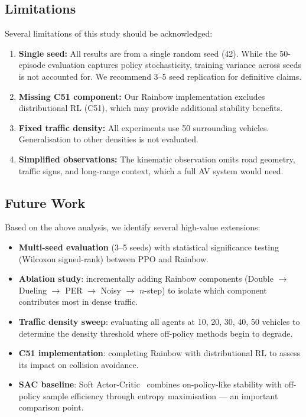 \documentclass[conference]{IEEEtran}
\begin{document}
\subsection{Limitations}

Several limitations of this study should be acknowledged:
\begin{enumerate}
  \item \textbf{Single seed:} All results are from a single random seed (42). While
        the 50-episode evaluation captures policy stochasticity, training variance
        across seeds is not accounted for. We recommend 3--5 seed replication for
        definitive claims.
  \item \textbf{Missing C51 component:} Our Rainbow implementation excludes
        distributional RL (C51), which may provide additional stability benefits.
  \item \textbf{Fixed traffic density:} All experiments use 50 surrounding vehicles.
        Generalisation to other densities is not evaluated.
  \item \textbf{Simplified observations:} The kinematic observation omits road
        geometry, traffic signs, and long-range context, which a full AV system
        would need.
\end{enumerate}

\subsection{Future Work}

Based on the above analysis, we identify several high-value extensions:
\begin{itemize}
  \item \textbf{Multi-seed evaluation} (3--5 seeds) with statistical significance
        testing (Wilcoxon signed-rank) between PPO and Rainbow.
  \item \textbf{Ablation study}: incrementally adding Rainbow components
        (Double $\to$ Dueling $\to$ PER $\to$ Noisy $\to$ $n$-step) to isolate
        which component contributes most in dense traffic.
  \item \textbf{Traffic density sweep}: evaluating all agents at 10, 20, 30, 40, 50
        vehicles to determine the density threshold where off-policy methods begin
        to degrade.
  \item \textbf{C51 implementation}: completing Rainbow with distributional RL
        to assess its impact on collision avoidance.
  \item \textbf{SAC baseline}: Soft Actor-Critic~\cite{haarnoja2018soft} combines
        on-policy-like stability with off-policy sample efficiency through entropy
        maximisation — an important comparison point.
\end{itemize}
\end{document}
